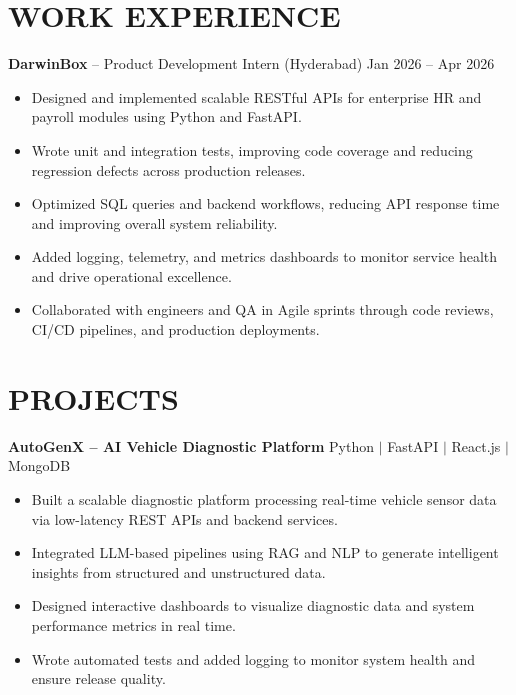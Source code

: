 \documentclass[a4paper,10pt]{article}
\begin{document}
\section*{WORK EXPERIENCE}

\textbf{DarwinBox} -- Product Development Intern (Hyderabad)
\hfill Jan 2026 -- Apr 2026

\begin{itemize}[leftmargin=0.16in,itemsep=1.5pt,topsep=2pt]

\item Designed and implemented scalable RESTful APIs for enterprise HR and payroll modules using Python and FastAPI.

\item Wrote unit and integration tests, improving code coverage and reducing regression defects across production releases.

\item Optimized SQL queries and backend workflows, reducing API response time and improving overall system reliability.

\item Added logging, telemetry, and metrics dashboards to monitor service health and drive operational excellence.

\item Collaborated with engineers and QA in Agile sprints through code reviews, CI/CD pipelines, and production deployments.

\end{itemize}

\section*{PROJECTS}

\textbf{AutoGenX -- AI Vehicle Diagnostic Platform}
\hfill Python $\mid$ FastAPI $\mid$ React.js $\mid$ MongoDB

\begin{itemize}[leftmargin=0.16in,itemsep=1.5pt,topsep=2pt]

\item Built a scalable diagnostic platform processing real-time vehicle sensor data via low-latency REST APIs and backend services.

\item Integrated LLM-based pipelines using RAG and NLP to generate intelligent insights from structured and unstructured data.

\item Designed interactive dashboards to visualize diagnostic data and system performance metrics in real time.

\item Wrote automated tests and added logging to monitor system health and ensure release quality.

\end{itemize}
\end{document}
